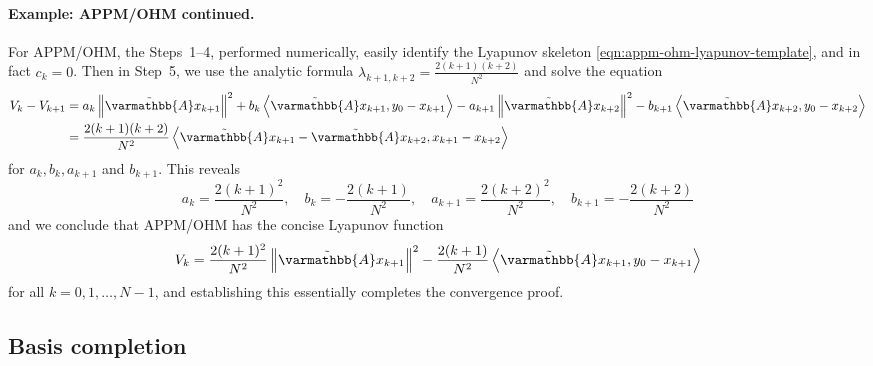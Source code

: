 \documentclass{article}
\theoremstyle{definition}
\theoremstyle{plain}
\newcommand{\opA}{{\varmathbb{A}}}
\newcommand{\inprod}[2]{\left\langle #1,#2 \right\rangle}
\newcommand{\sqnorm}[1]{\left\| #1 \right\|^2}
\newcommand{\topa}{\tilde{\opA}}
\begin{document}
\paragraph{Example: APPM/OHM continued.}
For APPM/OHM, the Steps~1--4, performed numerically, easily identify the Lyapunov skeleton \eqref{eqn:appm-ohm-lyapunov-template}, and in fact $c_k = 0$.
Then in Step~5, we use the analytic formula $\lambda_{k+1,k+2} = \frac{2(k+1)(k+2)}{N^2}$ and solve the equation
\begin{align*}
    V_k-V_{k+1}
    & = a_k\sqnorm{\topa x_{k+1}} + b_k\inprod{\topa x_{k+1}}{y_0-x_{k+1}} 
    - a_{k+1}\sqnorm{\topa x_{k+2}} - b_{k+1}\inprod{\topa x_{k+2}}{y_0-x_{k+2}} \\
    & = \frac{2(k+1)(k+2)}{N^2} \inprod{\topa x_{k+1}-\topa x_{k+2}}{x_{k+1}-x_{k+2}} 
\end{align*}
for $a_k, b_k, a_{k+1}$ and $b_{k+1}$.
This reveals
\[
    a_k=\frac{2(k+1)^2}{N^2}, \quad b_k=-\frac{2(k+1)}{N^2}, \quad a_{k+1}=\frac{2(k+2)^2}{N^2} , \quad b_{k+1}=-\frac{2(k+2)}{N^2} 
\]
and we conclude that APPM/OHM has the concise Lyapunov function
\begin{align}
\label{eqn:appm-ohm-closed-form-lyapunov}
    V_k = \frac{2(k+1)^2}{N^2} \sqnorm{\topa x_{k+1}} - \frac{2(k+1)}{N^2}\inprod{\topa x_{k+1}}{y_0-x_{k+1}}
\end{align}
for all $k=0,1,\dots,N-1$, and establishing this essentially completes the convergence proof.

\subsection{Basis completion}
\label{section:basis-completion} 
\end{document}
